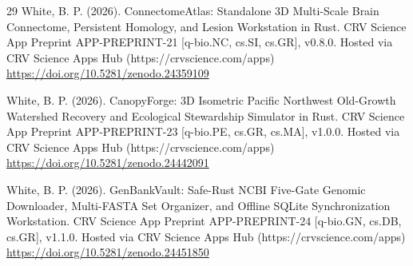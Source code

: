 \documentclass[10pt,letterpaper]{article}
\begin{document}
\begin{thebibliography}{29}
 White, B. P. (2026). ConnectomeAtlas: Standalone 3D Multi-Scale Brain Connectome, Persistent Homology, and Lesion Workstation in Rust. CRV Science App Preprint APP-PREPRINT-21 [q-bio.NC, cs.SI, cs.GR], v0.8.0. Hosted via CRV Science Apps Hub (https://crvscience.com/apps) \url{https://doi.org/10.5281/zenodo.24359109}

 White, B. P. (2026). CanopyForge: 3D Isometric Pacific Northwest Old-Growth Watershed Recovery and Ecological Stewardship Simulator in Rust. CRV Science App Preprint APP-PREPRINT-23 [q-bio.PE, cs.GR, cs.MA], v1.0.0. Hosted via CRV Science Apps Hub (https://crvscience.com/apps) \url{https://doi.org/10.5281/zenodo.24442091}

 White, B. P. (2026). GenBankVault: Safe-Rust NCBI Five-Gate Genomic Downloader, Multi-FASTA Set Organizer, and Offline SQLite Synchronization Workstation. CRV Science App Preprint APP-PREPRINT-24 [q-bio.GN, cs.DB, cs.GR], v1.1.0. Hosted via CRV Science Apps Hub (https://crvscience.com/apps) \url{https://doi.org/10.5281/zenodo.24451850}
\end{thebibliography}
\end{document}

